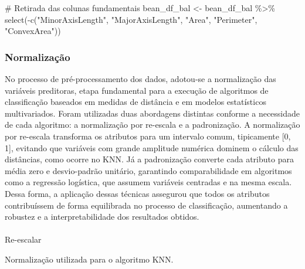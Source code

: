 \documentclass[
  letterpaper,
  DIV=11,
  numbers=noendperiod]{scrartcl}
\makeatletter
\let\oldparagraph\paragraph
\renewcommand{\paragraph}{
    \@ifstar
      \xxxParagraphStar
      \xxxParagraphNoStar
  }
\newcommand{\xxxParagraphStar}[1]{\oldparagraph*{#1}\mbox{}}
\newcommand{\xxxParagraphNoStar}[1]{\oldparagraph{#1}\mbox{}}
\newenvironment{Shaded}{\begin{snugshade}}{\end{snugshade}}
\newcommand{\CommentTok}[1]{\textcolor[rgb]{0.37,0.37,0.37}{#1}}
\newcommand{\FunctionTok}[1]{\textcolor[rgb]{0.28,0.35,0.67}{#1}}
\newcommand{\NormalTok}[1]{\textcolor[rgb]{0.00,0.23,0.31}{#1}}
\newcommand{\OtherTok}[1]{\textcolor[rgb]{0.00,0.23,0.31}{#1}}
\newcommand{\SpecialCharTok}[1]{\textcolor[rgb]{0.37,0.37,0.37}{#1}}
\newcommand{\StringTok}[1]{\textcolor[rgb]{0.13,0.47,0.30}{#1}}
\makeatother
\begin{document}
\begin{Shaded}
\begin{Highlighting}[]
\CommentTok{\# Retirada das colunas fundamentais }
\NormalTok{bean\_df\_bal }\OtherTok{\textless{}{-}}\NormalTok{ bean\_df\_bal }\SpecialCharTok{\%\textgreater{}\%} 
  \FunctionTok{select}\NormalTok{(}\SpecialCharTok{{-}}\FunctionTok{c}\NormalTok{(}\StringTok{"MinorAxisLength"}\NormalTok{, }\StringTok{"MajorAxisLength"}\NormalTok{, }\StringTok{"Area"}\NormalTok{, }\StringTok{"Perimeter"}\NormalTok{, }\StringTok{"ConvexArea"}\NormalTok{))}
\end{Highlighting}
\end{Shaded}

\subsubsection{Normalização}\label{normalizauxe7uxe3o}

No processo de pré-processamento dos dados, adotou-se a normalização das
variáveis preditoras, etapa fundamental para a execução de algoritmos de
classificação baseados em medidas de distância e em modelos estatísticos
multivariados. Foram utilizadas duas abordagens distintas conforme a
necessidade de cada algoritmo: a normalização por re-escala e a
padronização. A normalização por re-escala transforma os atributos para
um intervalo comum, tipicamente {[}0, 1{]}, evitando que variáveis com
grande amplitude numérica dominem o cálculo das distâncias, como ocorre
no KNN. Já a padronização converte cada atributo para média zero e
desvio-padrão unitário, garantindo comparabilidade em algoritmos como a
regressão logística, que assumem variáveis centradas e na mesma escala.
Dessa forma, a aplicação dessas técnicas assegurou que todos os
atributos contribuíssem de forma equilibrada no processo de
classificação, aumentando a robustez e a interpretabilidade dos
resultados obtidos.

\paragraph{Re-escalar}\label{re-escalar}

Normalização utilizada para o algoritmo KNN.
\end{document}
